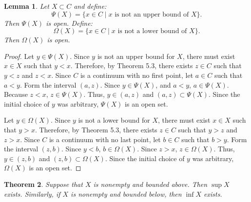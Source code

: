 \documentclass{amsart}
\newtheorem{theorem}{Theorem}
\newtheorem{lemma}[theorem]{Lemma}
\newcommand{\1}{\mathds{1}}
\numberwithin{equation}{section}
\numberwithin{theorem}{section}
\begin{document}
\begin{lemma}  Let $X \subset C$ and define:
\[
\Psi(X) = \{ x \in C \mid \text{$x$ is not an upper bound of $X$} \}.
\]
Then $\Psi(X)$ is open.
Define:
\[
\Omega(X) = \{ x \in C \mid \text{$x$ is not a lower bound of $X$} \}.
\]
Then $\Omega(X)$ is open.
\end{lemma}

\begin{proof}
	Let $y\in \Psi(X)$. Since $y$ is not an upper bound for $X$, there must exist $x\in X$ such that $y<x$. Therefore, by Theorem 5.3, there exists $z\in C$ such that $y<z$ and $z<x$. Since $C$ is a continuum with no first point, let $a\in C$ such that $a<y$. Form the interval $(a,z)$. Since $y\in \Psi(X)$, and $a<y$, $a\in \Psi(X)$. Because $z<x$, $z\in \Psi(X)$. Thus, $y\in (a,z)$ and $(a,z)\subset \Psi(X)$. Since the initial choice of $y$ was arbitrary, $\Psi(X)$ is an open set.
	
	Let $y\in \Omega(X)$. Since $y$ is not a lower bound for $X$, there must exist $x\in X$ such that $y>x$. Therefore, by Theorem 5.3, there exists $z\in C$ such that $y>z$ and $z>x$. Since $C$ is a continuum with no last point, let $b\in C$ such that $b>y$. Form the interval $(z,b)$. Since $y<b$, $b\in \Omega(X)$. Since $z>x$, $z\in \Omega(X)$. Thus, $y\in (z,b)$ and $(z,b)\subset \Omega(X)$. Since the initial choice of $y$ was arbitrary, $\Omega(X)$ is an open set.  
\end{proof}

\begin{theorem}  Suppose that $X$ is nonempty and bounded above. Then $\sup X$ exists. Similarly, if $X$ is nonempty and bounded below, then $\inf X$ exists.
\end{theorem}
\end{document}
